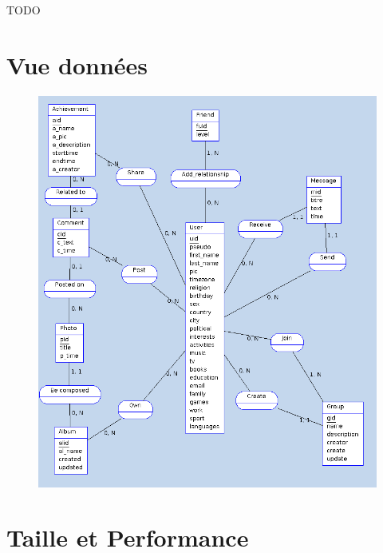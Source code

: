 \documentclass{life-fr}
\begin{document}
TODO


\chapter{Vue données}

\begin{figure}[H]
  \begin{center}
    \includegraphics[width=15cm]{img/vue_donnees.png}
  \end{center}
\end{figure}


\chapter{Taille et Performance}
\end{document}
